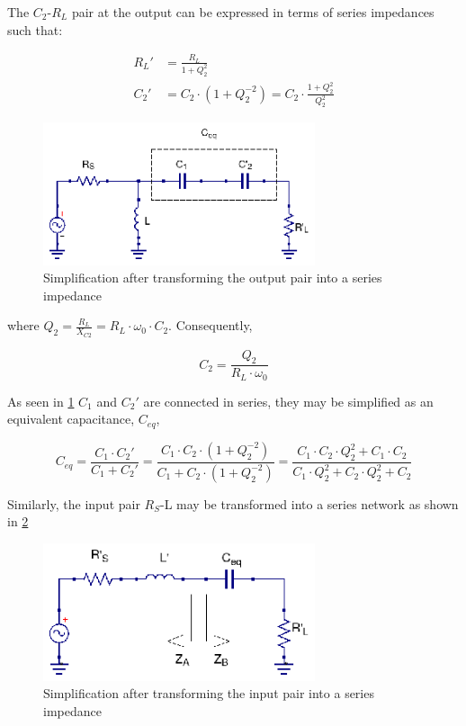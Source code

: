 \noindent The $C_2$-$R_L$ pair at the output can be expressed in terms of series impedances such that:

\begin{align}
  R_L' &= \frac{R_L}{1 + Q_2^2}\\
  C_2' &= C_2 \cdot (1 + Q_2^{-2}) = C_2 \cdot \frac{1 + Q_2^2}{Q_2^2}
\end{align}


\begin{figure}[H]
\centering
\includegraphics[width=80mm]{Tapped-C-ckt-equivalent}
\caption{Simplification after transforming the output pair into a series impedance}
\label{fig:tapped-c-simplification}
\end{figure}


\noindent where $Q_2 = \frac{R_L}{X_{C2}} = R_L \cdot \omega_0 \cdot C_2$. Consequently,

\begin{equation}
C_2 = \frac{Q_2}{R_L \cdot \omega_0}
\end{equation}

\noindent As seen in \ref{fig:tapped-c-simplification} $C_1$ and $C_2'$ are connected in series, they may be simplified as an equivalent capacitance, $C_{eq}$,

\begin{equation}
C_{eq} = \frac{C_1 \cdot C_2'}{C_1 + C_2'} = \frac{C_1 \cdot C_2 \cdot (1 + Q_2^{-2})}{C_1 + C_2 \cdot(1 + Q_2^{-2})} = \frac{C_1 \cdot C_2 \cdot Q_2^2 + C_1 \cdot C_2}{C_1 \cdot Q_2^2 + C_2 \cdot Q_2^2 + C_2}
\end{equation}

\noindent Similarly, the input pair $R_S$-L may be transformed into a series network as shown in \ref{fig:tapped-c-simplification-input}

\begin{figure}[H]
\centering
\includegraphics[width=80mm]{Tapped-C-ckt-equivalent-input-pair-transformed}
\caption{Simplification after transforming the input pair into a series impedance}
\label{fig:tapped-c-simplification-input}
\end{figure}

